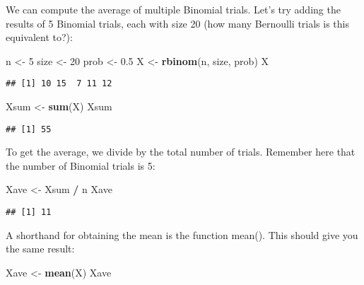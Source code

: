 \documentclass[
]{book}
\newenvironment{Shaded}{\begin{snugshade}}{\end{snugshade}}
\newcommand{\DecValTok}[1]{\textcolor[rgb]{0.00,0.00,0.81}{#1}}
\newcommand{\FloatTok}[1]{\textcolor[rgb]{0.00,0.00,0.81}{#1}}
\newcommand{\KeywordTok}[1]{\textcolor[rgb]{0.13,0.29,0.53}{\textbf{#1}}}
\newcommand{\NormalTok}[1]{#1}
\newcommand{\OperatorTok}[1]{\textcolor[rgb]{0.81,0.36,0.00}{\textbf{#1}}}
\newcommand{\StringTok}[1]{\textcolor[rgb]{0.31,0.60,0.02}{#1}}
\begin{document}
We can compute the average of multiple Binomial trials. Let's try adding the results of 5 Binomial trials, each with size 20 (how many Bernoulli trials is this equivalent to?):

\begin{Shaded}
\begin{Highlighting}[]
\NormalTok{n \textless{}{-}}\StringTok{ }\DecValTok{5}
\NormalTok{size \textless{}{-}}\StringTok{ }\DecValTok{20}
\NormalTok{prob \textless{}{-}}\StringTok{ }\FloatTok{0.5}
\NormalTok{X \textless{}{-}}\StringTok{ }\KeywordTok{rbinom}\NormalTok{(n, size, prob)}
\NormalTok{X}
\end{Highlighting}
\end{Shaded}

\begin{verbatim}
## [1] 10 15  7 11 12
\end{verbatim}

\begin{Shaded}
\begin{Highlighting}[]
\NormalTok{Xsum \textless{}{-}}\StringTok{ }\KeywordTok{sum}\NormalTok{(X)}
\NormalTok{Xsum}
\end{Highlighting}
\end{Shaded}

\begin{verbatim}
## [1] 55
\end{verbatim}

To get the average, we divide by the total number of trials. Remember here that the number of Binomial trials is 5:

\begin{Shaded}
\begin{Highlighting}[]
\NormalTok{Xave \textless{}{-}}\StringTok{ }\NormalTok{Xsum }\OperatorTok{/}\StringTok{ }\NormalTok{n}
\NormalTok{Xave}
\end{Highlighting}
\end{Shaded}

\begin{verbatim}
## [1] 11
\end{verbatim}

A shorthand for obtaining the mean is the function mean(). This should give you the same result:

\begin{Shaded}
\begin{Highlighting}[]
\NormalTok{Xave \textless{}{-}}\StringTok{ }\KeywordTok{mean}\NormalTok{(X)}
\NormalTok{Xave}
\end{Highlighting}
\end{Shaded}
\end{document}
